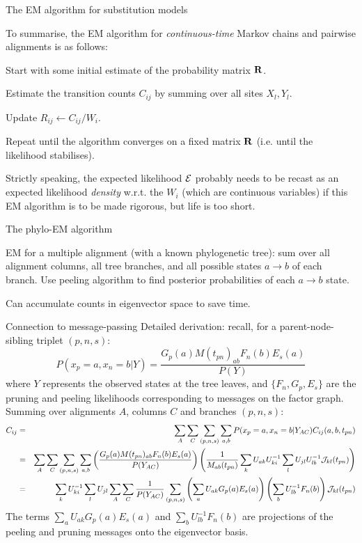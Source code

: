 \documentclass{beamer}
\begin{document}
\begin{frame}{The EM algorithm for substitution models}
\itemb
 \item To summarise, the EM algorithm for {\em continuous-time} Markov chains and pairwise alignments is as follows:
  \enumb
  \item Start with some initial estimate of the probability matrix ${\bf R}$.
  \item Estimate the transition counts $C_{ij}$ by summing over all sites $X_l,Y_l$.
  \item Update $R_{ij} \leftarrow C_{ij} / W_i$.
  \item Repeat until the algorithm converges on a fixed matrix ${\bf R}$ (i.e. until the likelihood stabilises).
  \enume
 \item Strictly speaking, the expected likelihood ${\cal E}$ probably needs to be recast as an expected likelihood {\em density}
w.r.t. the $W_i$ (which are continuous variables) if this EM algorithm is to be made rigorous, but life is too short.
\iteme
\end{frame}

\begin{frame}{The phylo-EM algorithm}
 \itemb
\item EM for a multiple alignment (with a known phylogenetic tree):
sum over all alignment columns, all tree branches, and all possible states $a \to b$ of each branch.
Use peeling algorithm to find posterior probabilities of each $a \to b$ state.
 \itemb
  \item Can accumulate counts in eigenvector space to save time.
\iteme
\iteme
\end{frame}

\begin{frame}{Connection to message-passing}
\small
Detailed derivation: recall, for a parent-node-sibling triplet $(p,n,s)$:
\[
P(x_p=a,x_n=b|Y) = \frac{G_p(a) M(t_{pn})_{ab} F_n(b) E_s(a)}{P(Y)}
\]
where $Y$ represents the observed states at the tree leaves,
and $\{F_n,G_p,E_s\}$ are the pruning and peeling likelihoods corresponding to messages on the factor graph. \\
Summing over alignments $A$, columns $C$ and branches $(p,n,s)$:
\tiny
\begin{eqnarray*}
C_{ij} & = & \sum_A \sum_C \sum_{(p,n,s)} \sum_{a,b} P(x_p=a,x_n=b|Y_{AC}) C_{ij}(a,b,t_{pn}) \\
& = & \sum_A \sum_C \sum_{(p,n,s)} \sum_{a,b}
\left( \frac{G_p(a) M(t_{pn})_{ab} F_n(b) E_s(a)}{P(Y_{AC})} \right)
\left( \frac{1}{M_{ab}(t_{pn})} \sum_k U_{ak} U^{-1}_{ki} \sum_l U_{jl} U^{-1}_{lb} {\cal J}_{kl}(t_{pn}) \right) \\
& = & \sum_k U^{-1}_{ki} \sum_l U_{jl}
\sum_A \sum_C \frac{1}{P(Y_{AC})} \sum_{(p,n,s)}
\left( \sum_a U_{ak} G_p(a) E_s(a) \right)
\left( \sum_b U^{-1}_{lb} F_n(b) \right)
{\cal J}_{kl}(t_{pn})
\end{eqnarray*}
The terms $\sum_a U_{ak} G_p(a) E_s(a)$ and $\sum_b U^{-1}_{lb} F_n(b)$ are projections of the peeling and pruning messages onto the eigenvector basis.

\end{frame}
\end{document}
